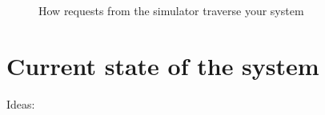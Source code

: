 \documentclass[12pt, a4paper, oneside]{book}
\begin{document}
\begin{spacing}{1.5}
\newpage
\begin{figure}[H]
    \centering
    \caption{How requests from the simulator traverse your system}
    
\end{figure}

\section{Current state of the system}
Ideas:
\begin{itemize}
    

\end{itemize}
\end{spacing}
\end{document}
